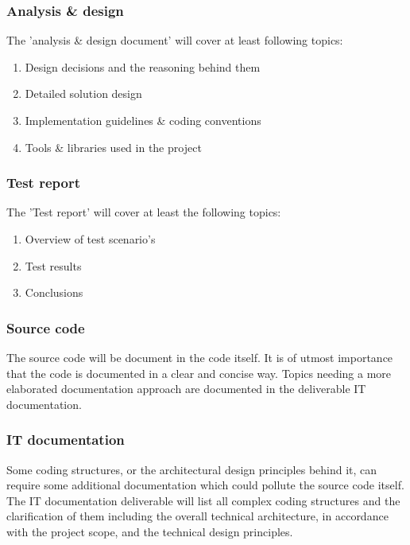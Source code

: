 \subsubsection{Analysis \& design}

The 'analysis \& design document' will cover at least following topics:

 	\begin{enumerate}
		\item Design decisions and the reasoning behind them
		\item Detailed solution design
		\item Implementation guidelines \& coding conventions
		\item Tools \& libraries used in the project
	\end {enumerate}

\subsubsection{Test report}

The 'Test report' will cover at least the following topics:

 	\begin{enumerate}
		\item Overview of test scenario's
		\item Test results
		\item Conclusions
	\end {enumerate}

\subsubsection{Source code}

The source code will be document in the code itself. It is of utmost importance that the code is documented in a clear and concise way.
Topics needing a more elaborated documentation approach are documented in the deliverable IT documentation.

\subsubsection{IT documentation}

Some coding structures, or the architectural design principles behind it, can require some additional documentation which could pollute the source code itself.
The IT documentation deliverable will list all complex coding structures and the clarification of them including the overall technical architecture, in accordance with the project scope, and the technical design principles.

